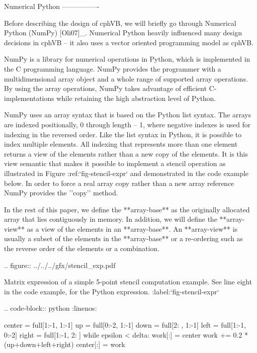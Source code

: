 
Numerical Python
----------------

Before describing the design of cphVB, we will briefly go through Numerical Python (NumPy) [Oli07]_. Numerical Python heavily influenced many design decisions in cphVB – it also uses a vector oriented programming model as cphVB.

NumPy is a library for numerical operations in Python, which is implemented in the C programming language. NumPy provides the programmer with a multidimensional array object and a whole range of supported array operations. By using the array operations, NumPy takes advantage of efficient C-implementations while retaining the high abstraction level of Python.

NumPy uses an array syntax that is based on the Python list syntax. The arrays are indexed positionally, 0 through length – 1, where negative indexes is used for indexing in the reversed order. Like the list syntax in Python, it is possible to index multiple elements. All indexing that represents more than one element returns a view of the elements rather than a new copy of the elements. It is this view semantic that makes it possible to implement a stencil operation as illustrated in Figure :ref:`fig-stencil-expr` and demonstrated in the code example below. In order to force a real array copy rather than a new array reference NumPy provides the ''copy'' method.

In the rest of this paper, we define the **array-base** as the originally allocated array that lies contiguously in memory. In addition, we will define the **array-view** as a view of the elements in an **array-base**. An **array-view** is usually a subset of the elements in the **array-base** or a re-ordering such as the reverse order of the elements or a combination.

.. figure:: ../../../gfx/stencil_exp.pdf

   Matrix expression of a simple 5-point stencil computation example. See line eight in the code example, for the Python expression. :label:`fig-stencil-expr`

.. code-block:: python
   :linenos:

   center = full[1:-1, 1:-1]
   up     = full[0:-2, 1:-1]
   down   = full[2:  , 1:-1]
   left   = full[1:-1, 0:-2]
   right  = full[1:-1, 2:  ]
   while epsilon < delta:
       work[:] = center
       work += 0.2 * (up+down+left+right)
       center[:] = work

